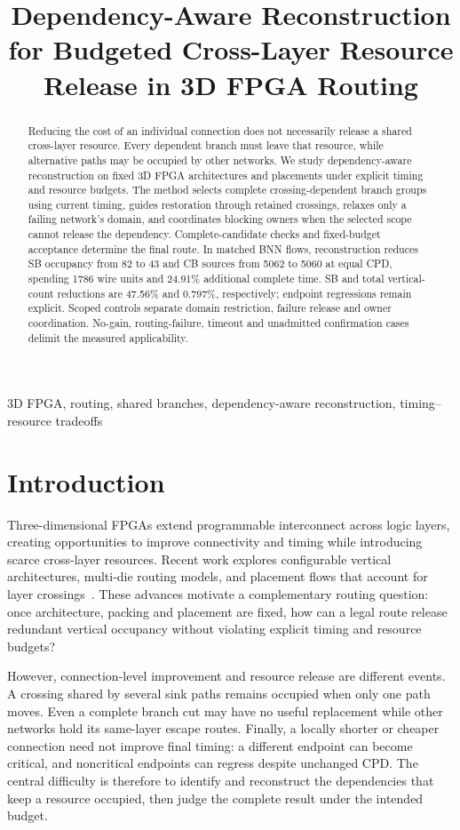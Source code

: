 \documentclass[conference,10pt]{IEEEtran}
\title{Dependency-Aware Reconstruction for Budgeted Cross-Layer Resource Release in 3D FPGA Routing}
\author{\IEEEauthorblockN{Anonymous submission}}
\begin{document}
\maketitle
\begin{abstract}
Reducing the cost of an individual connection does not necessarily release a shared cross-layer resource. Every dependent branch must leave that resource, while alternative paths may be occupied by other networks. We study dependency-aware reconstruction on fixed 3D FPGA architectures and placements under explicit timing and resource budgets. The method selects complete crossing-dependent branch groups using current timing, guides restoration through retained crossings, relaxes only a failing network's domain, and coordinates blocking owners when the selected scope cannot release the dependency. Complete-candidate checks and fixed-budget acceptance determine the final route. In matched BNN flows, reconstruction reduces SB occupancy from 82 to 43 and CB sources from 5062 to 5060 at equal CPD, spending 1786 wire units and 24.91\% additional complete time. SB and total vertical-count reductions are 47.56\% and 0.797\%, respectively; endpoint regressions remain explicit. Scoped controls separate domain restriction, failure release and owner coordination. No-gain, routing-failure, timeout and unadmitted confirmation cases delimit the measured applicability.
\end{abstract}
\begin{IEEEkeywords}
3D FPGA, routing, shared branches, dependency-aware reconstruction, timing--resource tradeoffs
\end{IEEEkeywords}

\section{Introduction}
Three-dimensional FPGAs extend programmable interconnect across logic layers, creating opportunities to improve connectivity and timing while introducing scarce cross-layer resources. Recent work explores configurable vertical architectures, multi-die routing models, and placement flows that account for layer crossings~\cite{lazagna,multidie,flatland}. These advances motivate a complementary routing question: once architecture, packing and placement are fixed, how can a legal route release redundant vertical occupancy without violating explicit timing and resource budgets?

However, connection-level improvement and resource release are different events. A crossing shared by several sink paths remains occupied when only one path moves. Even a complete branch cut may have no useful replacement while other networks hold its same-layer escape routes. Finally, a locally shorter or cheaper connection need not improve final timing: a different endpoint can become critical, and noncritical endpoints can regress despite unchanged CPD. The central difficulty is therefore to identify and reconstruct the dependencies that keep a resource occupied, then judge the complete result under the intended budget.
\end{document}
